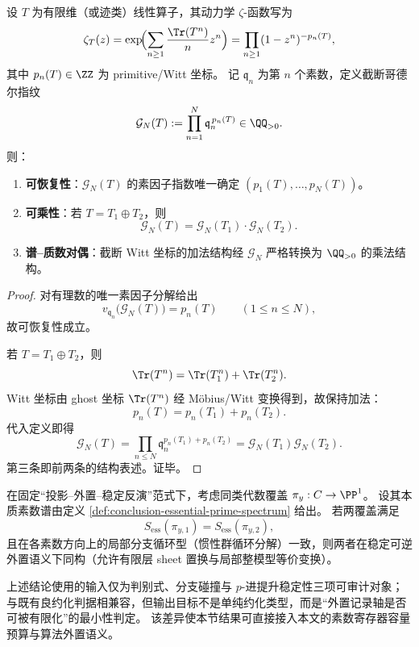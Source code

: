 \begin{proposition}\label{prop:conclusion-bigwitt-godel-multiplicative}
设 \(T\) 为有限维（或迹类）线性算子，其动力学 \(\zeta\)-函数写为
\[
\zeta_T(z)
=\exp\!\Bigl(\sum_{n\ge 1}\frac{\Tr(T^n)}{n}z^n\Bigr)
=\prod_{n\ge 1}(1-z^n)^{-p_n(T)},
\]
其中 \(p_n(T)\in\ZZ\) 为 primitive/Witt 坐标。
记 \(\mathfrak q_n\) 为第 \(n\) 个素数，定义截断哥德尔指纹
\[
\mathcal G_N(T):=\prod_{n=1}^{N}\mathfrak q_n^{\,p_n(T)}\in\QQ_{>0}.
\]
则：
\begin{enumerate}
  \item \textbf{可恢复性}：\(\mathcal G_N(T)\) 的素因子指数唯一确定
  \((p_1(T),\dots,p_N(T))\)。
  \item \textbf{可乘性}：若 \(T=T_1\oplus T_2\)，则
  \[
  \mathcal G_N(T)=\mathcal G_N(T_1)\cdot \mathcal G_N(T_2).
  \]
  \item \textbf{谱--质数对偶}：截断 Witt 坐标的加法结构经 \(\mathcal G_N\) 严格转换为 \(\QQ_{>0}\) 的乘法结构。
\end{enumerate}
\end{proposition}
\begin{proof}
对有理数的唯一素因子分解给出
\[
v_{\mathfrak q_n}\!\bigl(\mathcal G_N(T)\bigr)=p_n(T)\qquad(1\le n\le N),
\]
故可恢复性成立。

若 \(T=T_1\oplus T_2\)，则
\[
\Tr(T^n)=\Tr(T_1^n)+\Tr(T_2^n).
\]
Witt 坐标由 ghost 坐标 \(\Tr(T^n)\) 经 Möbius/Witt 变换得到，故保持加法：
\[
p_n(T)=p_n(T_1)+p_n(T_2).
\]
代入定义即得
\[
\mathcal G_N(T)
=\prod_{n\le N}\mathfrak q_n^{p_n(T_1)+p_n(T_2)}
=\mathcal G_N(T_1)\mathcal G_N(T_2).
\]
第三条即前两条的结构表述。证毕。
\end{proof}

\begin{conjecture}[本质素数谱与局部分支循环型的完备性]\label{conj:conclusion-essential-spectrum-completeness}
在固定“投影--外置--稳定反演”范式下，考虑同类代数覆盖
\(
\pi_y:C\to\PP^1
\)。
设其本质素数谱由定义 \ref{def:conclusion-essential-prime-spectrum} 给出。
若两覆盖满足
\[
S_{\mathrm{ess}}(\pi_{y,1})=S_{\mathrm{ess}}(\pi_{y,2}),
\]
且在各素数方向上的局部分支循环型（惯性群循环分解）一致，则两者在稳定可逆外置语义下同构（允许有限层 sheet 置换与局部整模型等价变换）。
\end{conjecture}

\begin{remark}[与判别式判据的接口定位]\label{rem:conclusion-essential-prime-spectrum-interface}
上述结论使用的输入仅为判别式、分支碰撞与 \(p\)-进提升稳定性三项可审计对象；与既有良约化判据相兼容，但输出目标不是单纯约化类型，而是“外置记录轴是否可被有限化”的最小性判定。
该差异使本节结果可直接接入本文的素数寄存器容量预算与算法外置语义。
\end{remark}
